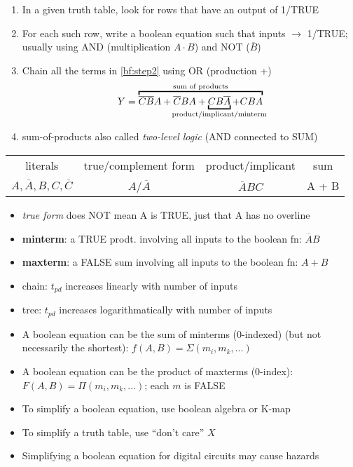 \begin{enumerate}
\item In a given truth table, look for rows that have an output of 1/TRUE
\item\label{bf:step2} For each such row, write a boolean equation such that inputs $\rightarrow$ 1/TRUE; usually using AND (multiplication $A\cdot B$) and NOT ($\overline{B}$)
\item Chain all the terms in \ref{bf:step2} using OR (production +)
  \begin{equation}\label{eq:fnspec1}
Y = \overbracket{\overline{C}\overline{B}A + \overline{C}BA + \underbracket{CB\overline{A}}_{\mathclap{\text{product/implicant/minterm}}} + CBA}^{\text{sum of products}}
  \end{equation}
\item sum-of-products also called \emph{two-level logic} (AND connected to SUM)
\end{enumerate}
\begin{tabular}[h]{cccc}
  \hline
  literals & true/complement form & product/implicant & sum \\
  $A, \overline{A}, B, C, \overline{C}$ & $A$/$\overline{A}$ & $\overline{A}BC$ & A + B \\
  \hline
\end{tabular}
\begin{itemize}
\item[] \emph{true form} does NOT mean A is TRUE, just that A has no overline
\item \textbf{minterm}: a TRUE prodt. involving all inputs to the boolean fn: $\overline{A}B$
\item \textbf{maxterm}: a FALSE sum involving all inputs to the boolean fn: $A + B$
\item chain: $t_{pd}$ increases linearly with number of inputs
\item tree: $t_{pd}$ increases logarithmatically with number of inputs
\item A boolean equation can be the sum of minterms (0-indexed) (but not necessarily the shortest): $f(A,B) = \Sigma(m_{i},m_{k},\ldots)$
\item A boolean equation can be the product of maxterms (0-index): $F(A,B) = \Pi(m_{i},m_{k},\ldots)$; each $m$ is FALSE
\item To simplify a boolean equation, use boolean algebra or K-map
\item To simplify a truth table, use ``don't care'' $X$
\item Simplifying a boolean equation for digital circuits may cause hazards
\end{itemize}
